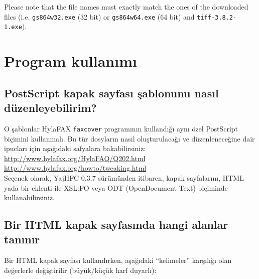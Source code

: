 \documentclass[a4paper,10pt]{scrartcl}
\begin{document}
Please note that the file names must exactly match the ones of the downloaded files (i.e. \texttt{gs864w32.exe} (32 bit) or \texttt{gs864w64.exe} (64 bit) and \texttt{tiff-3.8.2-1.exe}).

\section{Program kullanımı}

\subsection{PostScript kapak sayfası şablonunu nasıl düzenleyebilirim?}
O şablonlar HylaFAX \texttt{faxcover} programının kullandığı aynı özel PostScript biçimini kullanmalı.
Bu tür dosyların nasıl oluşturulacağı ve düzenleneceğine dair ipucları için aşağıdaki safyalara bakabilirsiniz:
\url{http://www.hylafax.org/HylaFAQ/Q202.html}\\
\url{http://www.hylafax.org/howto/tweaking.html}\\

Seçenek olarak, YajHFC 0.3.7 sürümünden itibaren, kapak sayfalarını, HTML yada bir eklenti ile XSL:FO veya ODT (OpenDocument Text) biçiminde kullanabilirsiniz.

 \subsection{Bir HTML kapak sayfasında hangi alanlar tanınır}
Bir HTML kapak sayfası kullanılırken, aşağıdaki ``kelimeler'' karşılığı olan değerlerle değiştirilir (büyük/küçük harf duyarlı):
\end{document}
